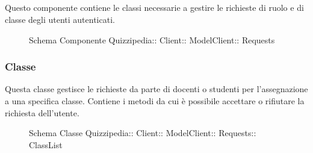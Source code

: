 \subsection{}
Questo componente contiene le classi necessarie a gestire le richieste di ruolo e di classe degli utenti autenticati.
\begin{figure}[H]
\centering
\noindent{}
\caption[Schema Componente Quizzipedia::Client::ModelClient::Requests]{Schema Componente Quizzipedia:: Client:: ModelClient:: Requests}
\end{figure}
\subsubsection{Classe }
Questa classe gestisce le richieste da parte di docenti o studenti per l'assegnazione a una specifica classe. Contiene i metodi da cui è possibile accettare o rifiutare la richiesta dell'utente.
\begin{figure}[H]
\centering
\noindent{}
\caption[Schema Classe ClassList]{Schema Classe Quizzipedia:: Client:: ModelClient:: Requests:: ClassList}
\end{figure}

